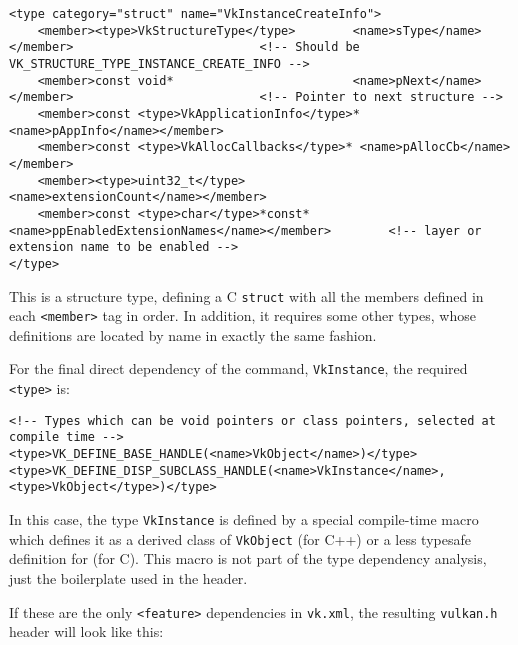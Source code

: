 \documentclass{article}
\def\code#1{{\tt #1}}
\def\tag#1{{\tt <#1>\index{<#1>}}}
\begin{document}
\begin{verbatim}
<type category="struct" name="VkInstanceCreateInfo">
    <member><type>VkStructureType</type>        <name>sType</name></member>                          <!-- Should be VK_STRUCTURE_TYPE_INSTANCE_CREATE_INFO -->
    <member>const void*                         <name>pNext</name></member>                          <!-- Pointer to next structure -->
    <member>const <type>VkApplicationInfo</type>* <name>pAppInfo</name></member>
    <member>const <type>VkAllocCallbacks</type>* <name>pAllocCb</name></member>
    <member><type>uint32_t</type>               <name>extensionCount</name></member>
    <member>const <type>char</type>*const*      <name>ppEnabledExtensionNames</name></member>        <!-- layer or extension name to be enabled -->
</type>
\end{verbatim}

\noindent This is a structure type, defining a C \code{struct} with all the
members defined in each \tag{member} tag in order. In addition, it requires
some other types, whose definitions are located by name in exactly the same
fashion.

For the final direct dependency of the command, \code{VkInstance}, the
required \tag{type} is:

\begin{verbatim}
<!-- Types which can be void pointers or class pointers, selected at compile time -->
<type>VK_DEFINE_BASE_HANDLE(<name>VkObject</name>)</type>
<type>VK_DEFINE_DISP_SUBCLASS_HANDLE(<name>VkInstance</name>, <type>VkObject</type>)</type>
\end{verbatim}

\noindent In this case, the type \code{VkInstance} is defined by a special
compile-time macro which defines it as a derived class of \code{VkObject}
(for C++) or a less typesafe definition for (for C). This macro is not part
of the type dependency analysis, just the boilerplate used in the header.

If these are the only \tag{feature} dependencies in \code{vk.xml}, the
resulting \code{vulkan.h} header will look like this:
\end{document}
